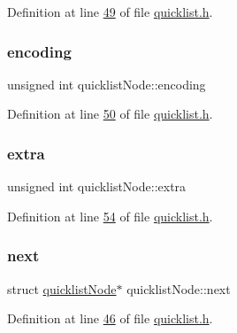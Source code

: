 Definition at line \hyperlink{quicklist_8h_source_l00049}{49} of file \hyperlink{quicklist_8h_source}{quicklist.\+h}.

\mbox{\label{structquicklistNode_a9f1f04ffad64fdd690f80559d2c7b072}} 
\subsubsection{\texorpdfstring{encoding}{encoding}}
{\footnotesize\ttfamily unsigned int quicklist\+Node\+::encoding}



Definition at line \hyperlink{quicklist_8h_source_l00050}{50} of file \hyperlink{quicklist_8h_source}{quicklist.\+h}.

\mbox{\label{structquicklistNode_a896f473bc29f7734091556355f3460dd}} 
\subsubsection{\texorpdfstring{extra}{extra}}
{\footnotesize\ttfamily unsigned int quicklist\+Node\+::extra}



Definition at line \hyperlink{quicklist_8h_source_l00054}{54} of file \hyperlink{quicklist_8h_source}{quicklist.\+h}.

\mbox{\label{structquicklistNode_a873015968ea9b9beafdd4ed679b55d1d}} 
\subsubsection{\texorpdfstring{next}{next}}
{\footnotesize\ttfamily struct \hyperlink{structquicklistNode}{quicklist\+Node}$\ast$ quicklist\+Node\+::next}



Definition at line \hyperlink{quicklist_8h_source_l00046}{46} of file \hyperlink{quicklist_8h_source}{quicklist.\+h}.

\mbox{\label{structquicklistNode_acf506a58b1cf34e897b6d95a5f8684de}} 
